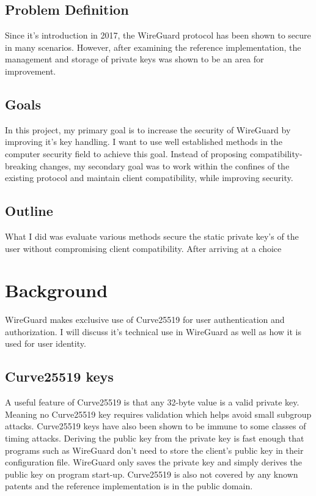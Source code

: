 \documentclass [11pt, proquest] {uwthesis}[2020/02/24]
\begin{document}
\subsection{Problem Definition}
Since it's introduction in 2017, the WireGuard protocol has been shown to secure in many scenarios. However, after examining the reference implementation, the management and storage of private keys was shown to be an area for improvement.

\subsection{Goals}
In this project, my primary goal is to increase the security of WireGuard by improving it's key handling. I want to use well established methods in the computer security field to achieve this goal. Instead of proposing compatibility-breaking changes, my secondary goal was to work within the confines of the existing protocol and maintain client compatibility, while improving security.

\subsection{Outline}
What I did was evaluate various methods secure the static private key's of the user without compromising client compatibility. After arriving at a choice 


\section {Background}
WireGuard makes exclusive use of Curve25519 for user authentication and authorization. I will discuss it's technical use in WireGuard as well as how it is used for user identity.

\subsection{Curve25519 keys}
A useful feature of Curve25519 is that any 32-byte value is a valid private key. Meaning no Curve25519 key requires validation which helps avoid small subgroup attacks. Curve25519 keys have also been shown to be immune to some classes of timing attacks\cite{noauthor_safecurves_2022}\cite{sasdrich_implementing_2015}.  Deriving the public key from the private key is fast enough that programs such as WireGuard don't need to store the client's public key in their configuration file. WireGuard only saves the private key and simply derives the public key on program start-up. Curve25519 is also not covered by any known patents and the reference implementation is in the public domain.
\end{document}
